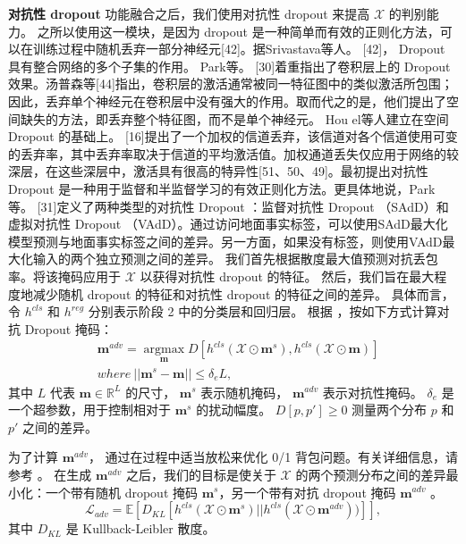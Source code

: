 \textbf{对抗性 dropout} 功能融合之后，我们使用对抗性 dropout \cite{park2018adversarial, lee2019drop} 来提高 $\mathcal{X}$ 的判别能力。
之所以使用这一模块，是因为 dropout 是一种简单而有效的正则化方法，可以在训练过程中随机丢弃一部分神经元[42]。据Srivastava等人。 [42]， Dropout 具有整合网络的多个子集的作用。 Park等。 [30]着重指出了卷积层上的 Dropout 效果。汤普森等[44]指出，卷积层的激活通常被同一特征图中的类似激活所包围；因此，丢弃单个神经元在卷积层中没有强大的作用。取而代之的是，他们提出了空间缺失的方法，即丢弃整个特征图，而不是单个神经元。 Hou el等人建立在空间 Dropout 的基础上。 [16]提出了一个加权的信道丢弃，该信道对各个信道使用可变的丢弃率，其中丢弃率取决于信道的平均激活值。加权通道丢失仅应用于网络的较深层，在这些深层中，激活具有很高的特异性[51、50、49]。最初提出对抗性 Dropout 是一种用于监督和半监督学习的有效正则化方法。更具体地说，Park等。 [31]定义了两种类型的对抗性 Dropout ：监督对抗性 Dropout （SAdD）和虚拟对抗性 Dropout （VAdD）。通过访问地面事实标签，可以使用SAdD最大化模型预测与地面事实标签之间的差异。另一方面，如果没有标签，则使用VAdD最大化输入的两个独立预测之间的差异。%
我们首先根据散度最大值预测对抗丢包率。将该掩码应用于 $\mathcal{X}$ 以获得对抗性 dropout 的特征。
然后，我们旨在最大程度地减少随机 dropout 的特征和对抗性 dropout 的特征之间的差异。
具体而言，令 $h^{cls}$ 和 $h^{reg}$ 分别表示阶段 2 中的分类层和回归层。
根据 \cite{lee2019drop}，按如下方式计算对抗 Dropout 掩码：
\begin{equation}
\begin{split}
    & \mathbf{m}^{adv} = \mathop{\arg\max}\limits_{\mathbf{m}}D[h^{cls}(\mathcal{X} \odot \mathbf{m}^s), h^{cls}(\mathcal{X} \odot \mathbf{m})] \\
    & where~||\mathbf{m}^s - \mathbf{m}|| \leq \delta_e L,
\end{split}
\end{equation}
其中 $L$ 代表 $\mathbf{m} \in \mathbb R^L$ 的尺寸，
$\mathbf{m}^s$ 表示随机掩码， $\mathbf{m}^{adv}$ 表示对抗性掩码。
$\delta_{e}$ 是一个超参数，用于控制相对于 $\mathbf{m}^{s}$ \cite{lee2019drop}的扰动幅度。
$D[p, p'] \geq 0$ 测量两个分布 $p$ 和 $p'$ 之间的差异。

为了计算 $\mathbf{m}^{adv}$，\cite{park2018adversarial} 通过在过程中适当放松来优化 0/1 背包问题。有关详细信息，请参考 \cite{park2018adversarial}。
在生成 $\mathbf{m}^{adv}$ 之后，我们的目标是使关于 $\mathcal{X}$ 的两个预测分布之间的差异最小化：一个带有随机 dropout 掩码 $\mathbf{m}^{s}$，另一个带有对抗 dropout 掩码 $\mathbf{m}^{adv}$ \cite{lee2019drop}。
\begin{equation}
    \mathcal{L}_{adv} = \mathbb E[D_{KL}[h^{cls}(\mathcal{X} \odot\mathbf{m}^{s})||h^{cls}(\mathcal{X} \odot\mathbf{m}^{adv}))]],
\end{equation}
其中 $D_{KL}$ 是 Kullback-Leibler 散度。

